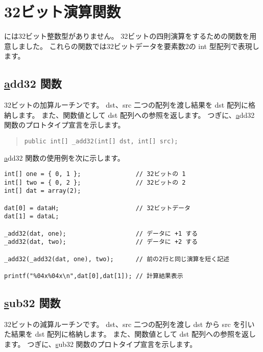 \section{32ビット演算関数}

\cmml には32ビット整数型がありません。
32ビットの四則演算をするための関数を用意しました。
これらの関数では32ビットデータを要素数2の int 型配列で表現します。

\subsection{\ul add32 関数}

32ビットの加算ルーチンです。
dst、src 二つの配列を渡し結果を dst 配列に格納します。
また、関数値として dst 配列への参照を返します。
つぎに、\ul add32 関数のプロトタイプ宣言を示します。

\begin{quote}
\begin{verbatim}
public int[] _add32(int[] dst, int[] src);
\end{verbatim}
\end{quote}

\ul add32 関数の使用例を次に示します。

\begin{mylist}
\begin{verbatim}
int[] one = { 0, 1 };               // 32ビットの 1
int[] two = { 0, 2 };               // 32ビットの 2
int[] dat = array(2);

dat[0] = dataH;                     // 32ビットデータ
dat[1] = dataL;

_add32(dat, one);                   // データに +1 する
_add32(dat, two);                   // データに +2 する

_add32(_add32(dat, one), two);      // 前の2行と同じ演算を短く記述

printf("%04x%04x\n",dat[0],dat[1]); // 計算結果表示
\end{verbatim}
\end{mylist}

\subsection{\ul sub32 関数}

32ビットの減算ルーチンです。
dst、src 二つの配列を渡し dst から src を引いた結果を dst 配列に格納します。
また、関数値として dst 配列への参照を返します。
つぎに、\ul sub32 関数のプロトタイプ宣言を示します。

